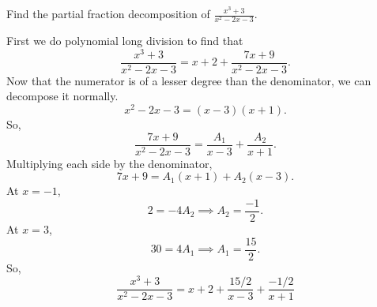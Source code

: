 \begin{example}
	Find the partial fraction decomposition of $\frac{x^3+3}{x^2-2x-3}$.
\end{example}
\noindent
First we do polynomial long division to find that
\begin{equation*}
	\frac{x^3+3}{x^2-2x-3} = x + 2 + \frac{7x+9}{x^2-2x-3}.
\end{equation*}
Now that the numerator is of a lesser degree than the denominator, we can decompose it normally.
\begin{equation*}
	x^2-2x-3 = (x-3)(x+1).
\end{equation*}
So,
\begin{equation*}
	\frac{7x+9}{x^2-2x-3} = \frac{A_1}{x-3} + \frac{A_2}{x+1}.
\end{equation*}
Multiplying each side by the denominator,
\begin{equation*}
	7x+9 = A_1(x+1) + A_2(x-3).
\end{equation*}
At $x=-1$,
\begin{equation*}
	2 = -4A_2 \implies A_2 = \frac{-1}{2}.
\end{equation*}
At $x=3$,
\begin{equation*}
	30 = 4A_1 \implies A_1 = \frac{15}{2}.
\end{equation*}
So,
\begin{equation*}
	\frac{x^3+3}{x^2-2x-3} = x + 2 + \frac{15/2}{x-3} + \frac{-1/2}{x+1}
\end{equation*}